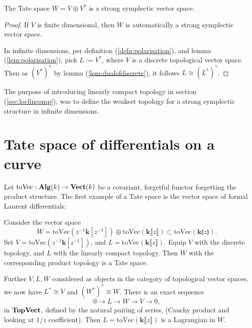         
        \begin{lem}    
        The Tate space \(W= V \oplus V^*\) is a strong symplectic vector space.
        \end{lem}    
        \begin{proof}
        If \(V\) is finite dimensional, then \(W\) is automatically a strong symplectic vector space.

        In infinite dimensions, per definition (\ref{defn:polarisation}), and lemma (\ref{lem:polarisation}), pick \(L := V^*\), where \(V\) is a discrete topological vector space. Then as \( (V^*)^*\) by lemma (\ref{lem:dualofdiscrete}), it follows \( L \cong (L^*)^*\).
        \end{proof}
        
        The purpose of introducing linearly compact topology in section (\ref{sec:loclincomp}), was to define the weakest topology for a strong symplectic structure in infinite dimensions.
        
        
        \section{Tate space of differentials on a curve}
        \label{sec:tatespaceofdiff}
        Let \(\mathrm{toVec} : \mathbf{Alg}(k) \rightarrow \mathbf{Vect}(k)\) be a covariant, forgetful functor forgetting the product structure. The first example of a Tate space is the vector space of formal Laurent differentials:
        \begin{ex}\label{ex:vecformallaurent}
        Consider the vector space 
        \[  W  =\mathrm{toVec} (z^{-1} \mathbf{k}[z^{-1}]  ) \oplus
         \mathrm{toVec} (\mathbf{k}  \lBrack z \rBrack  )   \subset \mathrm{toVec} (\mathbf{k}  \lParen z \rParen )  .\] 
         Set \(V = \mathrm{toVec} ( z^{-1} \mathbf{k}[z^{-1}]) \), and \(L = \mathrm{toVec} ( \mathbf{k}  \lBrack z \rBrack) \). Equip \(V\) with the discrete topology, and \(L\) with the linearly compact topology. Then \(W\) with the corresponding product topology is a Tate space.
         
        Further \(V, L,W\) considered as objects in the category of topological vector spaces, we now have \( L^* \cong V\) and \((W^*)^* \cong W\).
        There is an exact sequence
        \[ 0 \rightarrow L \rightarrow W \rightarrow V \rightarrow 0,\]
        in \( \mathbf{TopVect}\),
        defined by the natural pairing of series, (Cauchy product and looking at \(1/z\) coefficient). Then
        \(L =\mathrm{toVec}(\mathbf{k} \lBrack z \rBrack)\) is a Lagrangian in \(W\).
        \end{ex}        
        
